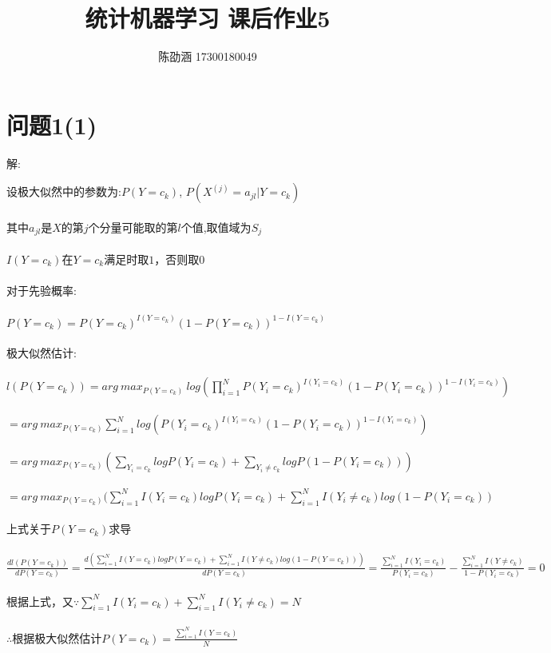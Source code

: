 \documentclass[]{article}
\title{统计机器学习 课后作业5}
\author{陈劭涵 17300180049}
\begin{document}
	
\maketitle


\section{问题1(1)}
\begin{flushleft}
解:
\end{flushleft}
设极大似然中的参数为:$P(Y=c_k)$, $P(X^{(j)}=a_{jl}|Y=c_k)$\\\\
其中$a_{jl}$是$X$的第$j$个分量可能取的第$l$个值,取值域为$S_j$\\\\
$I(Y=c_k)$在$Y=c_k$满足时取$1$，否则取$0$\\\\
对于先验概率:\\\\
$P(Y=c_k)=P(Y=c_k)^{I(Y=c_k)}(1-P(Y=c_k))^{1-I(Y=c_k)}$\\\\
极大似然估计:\\\\
$l(P(Y=c_k))=arg\ max_{P(Y=c_k)} \ log(\prod_{i=1}^{N} P(Y_i=c_k)^{I(Y_i=c_k)}(1-P(Y_i=c_k))^{1-I(Y_i=c_k)})$\\\\
$=arg\ max_{P(Y=c_k)} \sum_{i=1}^{N} log(P(Y_i=c_k)^{I(Y_i=c_k)}(1-P(Y_i=c_k))^{1-I(Y_i=c_k)})$\\\\
$=arg\ max_{P(Y=c_k)} (\sum_{Y_i=c_k}logP(Y_i=c_k)+\sum_{Y_i\neq c_k}logP(1-P(Y_i=c_k)))$\\\\
$=arg\ max_{P(Y=c_k)} (\sum_{i=1}^{N}I(Y_i=c_k)logP(Y_i=c_k)+\sum_{i=1}^{N}I(Y_i\neq c_k)log(1-P(Y_i=c_k))$\\\\
上式关于$P(Y=c_k)$求导\\\\
$\frac{dl(P(Y=c_k))}{dP(Y=c_k)}=\frac{d(\sum_{i=1}^{N}I(Y=c_k)logP(Y=c_k)+\sum_{i=1}^{N}I(Y\neq c_k)log(1-P(Y=c_k)))}{dP(Y=c_k)}=\frac{\sum_{i=1}^{N}I(Y_i=c_k)}{P(Y_i=c_k)}-\frac{\sum_{i=1}^{N}I(Y\neq c_k)}{1-P(Y_i=c_k)}=0$\\\\
根据上式，又$\because \sum_{i=1}^{N}I(Y_i=c_k)+\sum_{i=1}^{N}I(Y_i\neq c_k)=N$\\\\
$\therefore$根据极大似然估计$P(Y=c_k)=\frac{\sum_{i=1}^{N}I(Y=c_k)}{N}$\\\\
\end{document}
